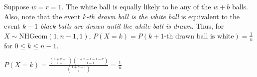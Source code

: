 Suppose $w = r = 1$. The white ball is equally likely to be any of the $w+b$
balls. Also, note that the event {\it $k$-th drawn ball is the white ball } is
equivalent to the event {\it $k-1$ black balls are drawn until the white ball is
drawn}. Thus, for $X \sim \text{NHGeom}(1, n-1, 1)$, $P(X = k) = P(k+1\text{-th
drawn ball is white}) = \frac{1}{n}$ for $0 \leq k \leq n-1$.

$P(X = k) = \frac{\binom{1+k-1}{1-1}\binom{1+n-1-1-k}{1-1}}{
\binom{1+n-1}{1}} = \frac{1}{n}$